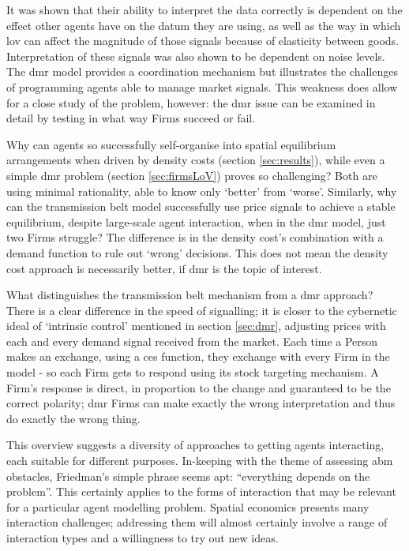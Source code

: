 It was shown that their ability to interpret the data correctly is dependent on the effect other agents have on the datum they are using, as well as the way in which \gls{lov} can affect the magnitude of those signals because of elasticity between goods. Interpretation of these signals was also shown to be dependent on noise levels. The \gls{dmr} model provides a coordination mechanism but illustrates the challenges of programming agents able to manage market signals. This weakness does allow for a close study of the problem, however: the \gls{dmr} issue can be examined in detail by testing in what way Firms succeed or fail.

Why can agents so successfully self-organise into spatial equilibrium arrangements when driven by density costs (section \ref{sec:results}), while even a simple \gls{dmr} problem (section \ref{sec:firmsLoV}) proves so challenging? Both are using minimal rationality, able to know only `better' from `worse'. Similarly, why can the transmission belt model successfully use price signals to achieve a stable equilibrium, despite large-scale agent interaction, when in the \gls{dmr} model, just two Firms struggle? The difference is in the density cost's combination with a demand function to rule out `wrong' decisions. This does not mean the density cost approach is necessarily better, if \gls{dmr} is the topic of interest.

What distinguishes the transmission belt mechanism from a \gls{dmr} approach? There is a clear difference in the speed of signalling; it is closer to the cybernetic ideal of `intrinsic control' mentioned in section \ref{sec:dmr}, adjusting prices with each and every demand signal received from the market. Each time a Person makes an exchange, using a \gls{ces} function, they exchange with every Firm in the model - so each Firm gets to respond using its stock targeting mechanism. A Firm's response is direct, in proportion to the change and guaranteed to be the correct polarity; \gls{dmr} Firms can make exactly the wrong interpretation and thus do exactly the wrong thing. 

This overview suggests a diversity of approaches to getting agents interacting, each suitable for different purposes. In-keeping with the theme of assessing \gls{abm} obstacles, Friedman's simple phrase seems apt: ``everything depends on the problem''. This certainly applies to the forms of interaction that may be relevant for a particular agent modelling problem. Spatial economics presents many interaction challenges; addressing them will almost certainly involve a range of interaction types and a willingness to try out new ideas.

